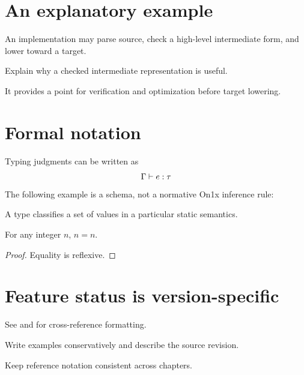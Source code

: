\documentclass[11pt,twoside,openany,full]{on1x-book}
\begin{document}
\section{An explanatory example}
\begin{OnxExample}\label{ex:stages}
An implementation may parse source, check a high-level intermediate form, and lower toward a target.
\end{OnxExample}
\begin{OnxDiagram}
\end{OnxDiagram}
\begin{OnxExercise}\label{ex:compiler}
Explain why a checked intermediate representation is useful.
\end{OnxExercise}
\begin{OnxSolution}
It provides a point for verification and optimization before target lowering.
\end{OnxSolution}
\section{Formal notation}
Typing judgments can be written as
\[
  \Gamma\vdash e : \tau
\]
The following example is a schema, not a normative On1x inference rule:
\begin{OnxRules}
\end{OnxRules}
\begin{OnxDefinition}\label{def:type}
A type classifies a set of values in a particular static semantics.
\end{OnxDefinition}
\begin{OnxTheorem}
For any integer $n$, $n=n$.
\end{OnxTheorem}
\begin{proof}
Equality is reflexive.
\end{proof}
\section{Feature status is version-specific}
\begin{OnxFeatureMatrix}
\end{OnxFeatureMatrix}
See  and  for cross-reference formatting.
\begin{OnxSummary}
\item Write examples conservatively and describe the source revision.
\item Keep reference notation consistent across chapters.
\end{OnxSummary}
\end{document}
